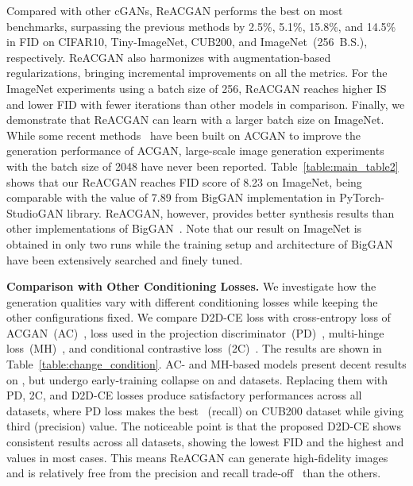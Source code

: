 \documentclass{article}
\begin{document}
Compared with other cGANs, ReACGAN performs the best on most benchmarks, surpassing the previous methods by 2.5\%, 5.1\%, 15.8\%, and 14.5\% in FID on CIFAR10, Tiny-ImageNet, CUB200, and ImageNet~(256~B.S.), respectively. ReACGAN also harmonizes with augmentation-based regularizations, bringing incremental improvements on all the metrics. For the ImageNet experiments using a batch size of 256, ReACGAN reaches higher IS and lower FID with fewer iterations than other models in comparison. Finally, we demonstrate that ReACGAN can learn with a larger batch size on ImageNet. While some recent methods~\cite{NIPS2019_8414, zhou2018activation, hou2021cgans} have been built on ACGAN to improve the generation performance of ACGAN, large-scale image generation experiments with the batch size of 2048 have never been reported. Table~\ref{table:main_table2} shows that our ReACGAN reaches FID score of 8.23 on ImageNet, being comparable with the value of 7.89 from BigGAN implementation in PyTorch-StudioGAN library. ReACGAN, however, provides better synthesis results than other implementations of BigGAN~\cite{Brock2019LargeSG, zhou2020omni}. Note that our result on ImageNet is obtained in only two runs while the training setup and architecture of BigGAN have been extensively searched and finely tuned.

\textbf{Comparison with Other Conditioning Losses.} 
We investigate how the generation qualities vary with different conditioning losses while keeping the other configurations fixed.
We compare D2D-CE loss with cross-entropy loss of ACGAN~(AC)~\cite{Odena2017ConditionalIS}, loss used in the projection discriminator~(PD)~\cite{Miyato2018cGANsWP}, multi-hinge loss~(MH)~\cite{kavalerov2021multi}, and conditional contrastive loss~(2C)~\cite{kang2020contragan}. The results are shown in Table~\ref{table:change_condition}.
AC- and MH-based models present decent results on , but undergo early-training collapse on  and  datasets.
Replacing them with PD, 2C, and D2D-CE losses produce satisfactory performances across all datasets, where PD loss makes the best ~(recall) on CUB200 dataset while giving third  (precision) value.
The noticeable point is that the proposed D2D-CE shows consistent results across all datasets, showing the lowest FID and the highest  and  values in most cases. This means ReACGAN can generate high-fidelity images and is relatively free from the precision and recall trade-off~\cite{sajjadi2018assessing} than the others.
\end{document}
